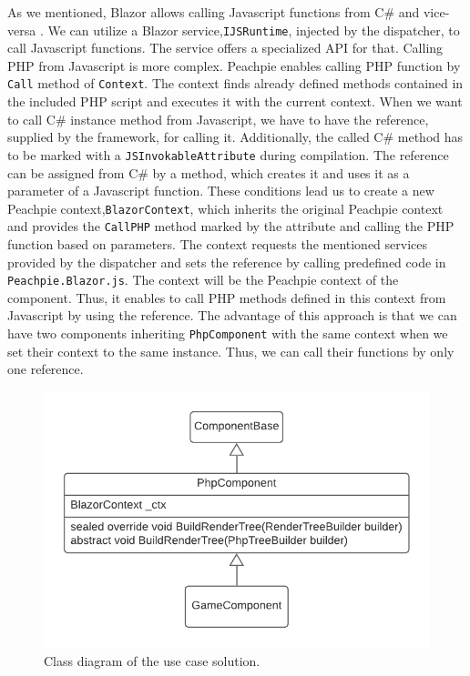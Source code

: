As we mentioned, Blazor allows calling Javascript functions from C\# \cite{online:interop1} and vice-versa \cite{online:interop2}.
We can utilize a Blazor service,\texttt{IJSRuntime}, injected by the dispatcher, to call Javascript functions.
The service offers a specialized API for that.
Calling PHP from Javascript is more complex.
Peachpie enables calling PHP function by \texttt{Call} method of \texttt{Context}. 
The context finds already defined methods contained in the included PHP script and executes it with the current context.
When we want to call C\# instance method from Javascript, we have to have the reference, supplied by the framework, for calling it.
Additionally, the called C\# method has to be marked with a \texttt{JSInvokableAttribute} during compilation.
The reference can be assigned from C\# by a method, which creates it and uses it as a parameter of a Javascript function.
These conditions lead us to create a new Peachpie context,\texttt{BlazorContext}, which inherits the original Peachpie context and provides the \texttt{CallPHP} method marked by the attribute and calling the PHP function based on parameters.
The context requests the mentioned services provided by the dispatcher and sets the reference by calling predefined code in \texttt{Peachpie.Blazor.js}.
The context will be the Peachpie context of the component.
Thus, it enables to call PHP methods defined in this context from Javascript by using the reference.
The advantage of this approach is that we can have two components inheriting \texttt{PhpComponent} with the same context when we set their context to the same instance.
Thus, we can call their functions by only one reference.
\par
\begin{figure}\centering
\includegraphics[scale=0.8]{./img/PhpComponentSolution}
\caption{Class diagram of the use case solution.}
\label{img17:solution}
\end{figure}
